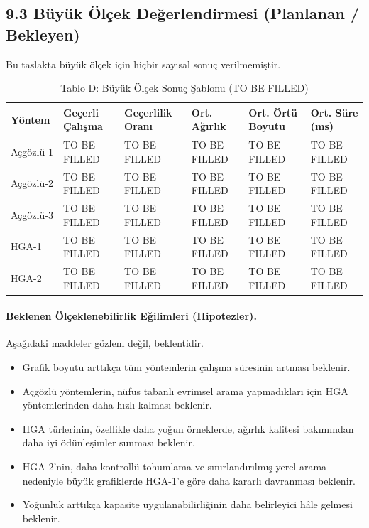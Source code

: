 \documentclass[11pt]{article}
\begin{document}
\subsection*{9.3 Büyük Ölçek Değerlendirmesi (Planlanan / Bekleyen)}

Bu taslakta büyük ölçek için hiçbir sayısal sonuç verilmemiştir.

\begin{table}[h]
\centering
\caption{Tablo D: Büyük Ölçek Sonuç Şablonu (TO BE FILLED)}
\label{tab:large-results-tr}
\begin{tabular}{llllll}
\toprule
Yöntem & Geçerli Çalışma & Geçerlilik Oranı & Ort. Ağırlık & Ort. Örtü Boyutu & Ort. Süre (ms) \\
\midrule
Açgözlü-1 & TO BE FILLED & TO BE FILLED & TO BE FILLED & TO BE FILLED & TO BE FILLED \\
Açgözlü-2 & TO BE FILLED & TO BE FILLED & TO BE FILLED & TO BE FILLED & TO BE FILLED \\
Açgözlü-3 & TO BE FILLED & TO BE FILLED & TO BE FILLED & TO BE FILLED & TO BE FILLED \\
HGA-1 & TO BE FILLED & TO BE FILLED & TO BE FILLED & TO BE FILLED & TO BE FILLED \\
HGA-2 & TO BE FILLED & TO BE FILLED & TO BE FILLED & TO BE FILLED & TO BE FILLED \\
\bottomrule
\end{tabular}
\end{table}

\paragraph{Beklenen Ölçeklenebilirlik Eğilimleri (Hipotezler).}
Aşağıdaki maddeler gözlem değil, beklentidir.
\begin{itemize}
    \item Grafik boyutu arttıkça tüm yöntemlerin çalışma süresinin artması beklenir.
    \item Açgözlü yöntemlerin, nüfus tabanlı evrimsel arama yapmadıkları için HGA yöntemlerinden daha hızlı kalması beklenir.
    \item HGA türlerinin, özellikle daha yoğun örneklerde, ağırlık kalitesi bakımından daha iyi ödünleşimler sunması beklenir.
    \item HGA-2'nin, daha kontrollü tohumlama ve sınırlandırılmış yerel arama nedeniyle büyük grafiklerde HGA-1'e göre daha kararlı davranması beklenir.
    \item Yoğunluk arttıkça kapasite uygulanabilirliğinin daha belirleyici hâle gelmesi beklenir.
\end{itemize}
\end{document}

